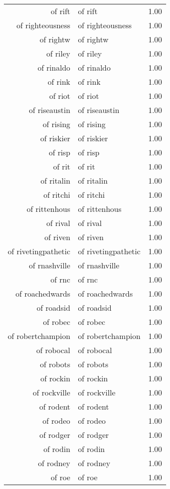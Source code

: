 \begin{table}[ht]
\begin{tabular}{rlr}
  of rift & of rift & 1.00 \\ 
  of righteousness & of righteousness & 1.00 \\ 
  of rightw & of rightw & 1.00 \\ 
  of riley & of riley & 1.00 \\ 
  of rinaldo & of rinaldo & 1.00 \\ 
  of rink & of rink & 1.00 \\ 
  of riot & of riot & 1.00 \\ 
  of riseaustin & of riseaustin & 1.00 \\ 
  of rising & of rising & 1.00 \\ 
  of riskier & of riskier & 1.00 \\ 
  of risp & of risp & 1.00 \\ 
  of rit & of rit & 1.00 \\ 
  of ritalin & of ritalin & 1.00 \\ 
  of ritchi & of ritchi & 1.00 \\ 
  of rittenhous & of rittenhous & 1.00 \\ 
  of rival & of rival & 1.00 \\ 
  of riven & of riven & 1.00 \\ 
  of rivetingpathetic & of rivetingpathetic & 1.00 \\ 
  of rnashville & of rnashville & 1.00 \\ 
  of rnc & of rnc & 1.00 \\ 
  of roachedwards & of roachedwards & 1.00 \\ 
  of roadsid & of roadsid & 1.00 \\ 
  of robec & of robec & 1.00 \\ 
  of robertchampion & of robertchampion & 1.00 \\ 
  of robocal & of robocal & 1.00 \\ 
  of robots & of robots & 1.00 \\ 
  of rockin & of rockin & 1.00 \\ 
  of rockville & of rockville & 1.00 \\ 
  of rodent & of rodent & 1.00 \\ 
  of rodeo & of rodeo & 1.00 \\ 
  of rodger & of rodger & 1.00 \\ 
  of rodin & of rodin & 1.00 \\ 
  of rodney & of rodney & 1.00 \\ 
  of roe & of roe & 1.00 \\ 

\end{tabular}
\end{table}
